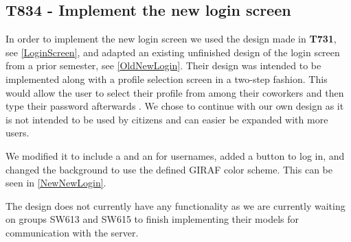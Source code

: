 \subsection{T834 - Implement the new login screen}\label{LoginXML}
In order to implement the new login screen we used the design made in
\textbf{T731}, see \autoref{LoginScreen}, and adapted an existing unfinished
design of the login screen from a prior semester, see \autoref{OldNewLogin}.
Their design was intended to be implemented along with a profile selection
screen in a two-step fashion. This would allow the user to select their profile
from among their coworkers and then type their password afterwards
\citep[Sec.9.5, p.68-70]{RestLogin}. We chose to continue with our own design as
it is not intended to be used by citizens and can easier be expanded with more
users.


We modified it to include a  and an  for
usernames, added a button to log in, and changed the background to use the
defined GIRAF color scheme. This can be seen in \autoref{NewNewLogin}.


The design does not currently have any functionality as we are currently waiting
on groups SW613 and SW615 to finish implementing their models for communication
with the server.

